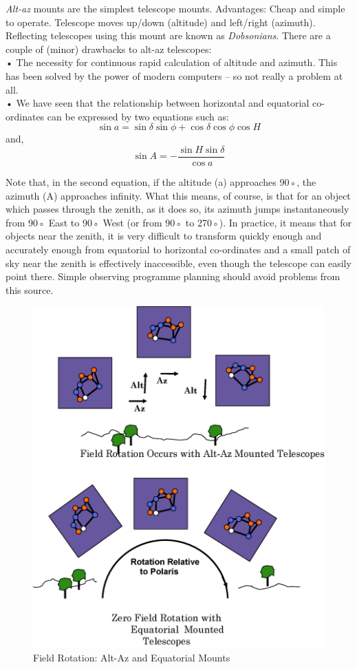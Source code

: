 \documentclass[a4paper,12pt]{extarticle}
\begin{document}
\textit{Alt-az} mounts are the simplest telescope mounts. Advantages: Cheap and simple to operate.
Telescope moves up/down (altitude) and left/right
(azimuth). Reflecting telescopes using this mount are known as \textit{Dobsonians}. There are a couple of (minor) drawbacks to alt-az telescopes:\\

• The necessity for continuous rapid calculation of altitude and azimuth. This has been solved by the power of modern computers – so not really a problem at all.\\
• We have seen that the relationship between horizontal and equatorial co-ordinates can be expressed by two equations such as:
\[\sin a=\sin \delta \sin \phi+\cos \delta \cos \phi \cos H\]
and,
\[\sin A=-\frac{\sin H \sin \delta}{\cos a}\]

Note that, in the second equation, if the altitude (a) approaches 90◦, the azimuth (A) approaches infinity. What this means, of course, is that for an object which passes through the zenith, as it does so, its azimuth jumps instantaneously from 90◦ East to 90◦ West (or from 90◦ to 270◦). In practice, it means that for objects near the zenith, it is very difficult to transform quickly enough and accurately enough from equatorial to horizontal co-ordinates and a small patch of sky near the zenith is effectively inaccessible, even though the telescope can easily point there. Simple observing programme planning should avoid problems from this source.\\


\begin{figure}
	\centering
	\includegraphics[width=\linewidth]{fieldrot.eps}
	\caption{Field Rotation: Alt-Az and Equatorial Mounts}
\end{figure}
\end{document}
